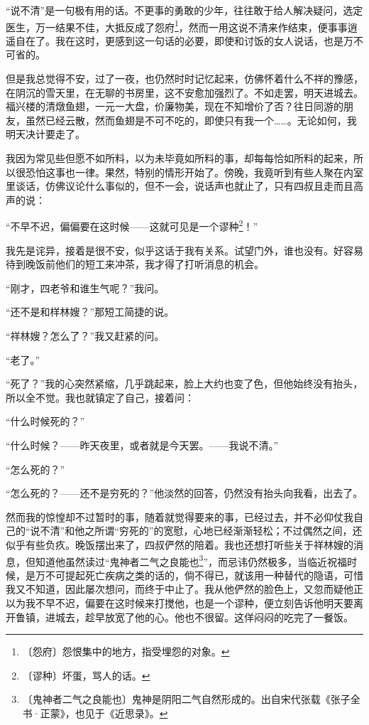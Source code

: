 \documentclass[12pt,UTF-8,openany]{ctexbook}
\begin{document}
\begin{normalsize}
    “说不清”是一句极有用的话。不更事的勇敢的少年，往往敢于给人解决疑问，选定医生，万一结果不佳，大抵反成了怨府\footnote{〔怨府〕怨恨集中的地方，指受埋怨的对象。}，然而一用这说不清来作结束，便事事逍遥自在了。我在这时，更感到这一句话的必要，即使和讨饭的女人说话，也是万不可省的。
    
    但是我总觉得不安，过了一夜，也仍然时时记忆起来，仿佛怀着什么不祥的豫感，在阴沉的雪天里，在无聊的书房里，这不安愈加强烈了。不如走罢，明天进城去。福兴楼的清燉鱼翅，一元一大盘，价廉物美，现在不知增价了否？往日同游的朋友，虽然已经云散，然而鱼翅是不可不吃的，即使只有我一个……。无论如何，我明天决计要走了。
    
    我因为常见些但愿不如所料，以为未毕竟如所料的事，却每每恰如所料的起来，所以很恐怕这事也一律。果然，特别的情形开始了。傍晚，我竟听到有些人聚在内室里谈话，仿佛议论什么事似的，但不一会，说话声也就止了，只有四叔且走而且高声的说：
    
    “不早不迟，偏偏要在这时候——这就可见是一个谬种\footnote{〔谬种〕坏蛋，骂人的话。}！”
    
    我先是诧异，接着是很不安，似乎这话于我有关系。试望门外，谁也没有。好容易待到晚饭前他们的短工来冲茶，我才得了打听消息的机会。
    
    “刚才，四老爷和谁生气呢？”我问。
    
    “还不是和样林嫂？”那短工简捷的说。
    
    “祥林嫂？怎么了？”我又赶紧的问。
    
    “老了。”
    
    “死了？”我的心突然紧缩，几乎跳起来，脸上大约也变了色，但他始终没有抬头，所以全不觉。我也就镇定了自己，接着问：
    
    “什么时候死的？”
    
    “什么时候？——昨天夜里，或者就是今天罢。——我说不清。”
    
    “怎么死的？”
    
    “怎么死的？——还不是穷死的？”他淡然的回答，仍然没有抬头向我看，出去了。
    
    然而我的惊惶却不过暂时的事，随着就觉得要来的事，已经过去，并不必仰仗我自己的“说不清”和他之所谓“穷死的”的宽慰，心地已经渐渐轻松；不过偶然之间，还似乎有些负疚。晚饭摆出来了，四叔俨然的陪着。我也还想打听些关于祥林嫂的消息，但知道他虽然读过“鬼神者二气之良能也\footnote{〔鬼神者二气之良能也〕鬼神是阴阳二气自然形成的。出自宋代张载《张子全书·正蒙》，也见于《近思录》。}”，而忌讳仍然极多，当临近祝福时候，是万不可提起死亡疾病之类的话的，倘不得已，就该用一种替代的隐语，可惜我又不知道，因此屡次想问，而终于中止了。我从他俨然的脸色上，又忽而疑他正以为我不早不迟，偏要在这时候来打搅他，也是一个谬种，便立刻告诉他明天要离开鲁镇，进城去，趁早放宽了他的心。他也不很留。这佯闷闷的吃完了一餐饭。
    

\end{normalsize}
\end{document}
